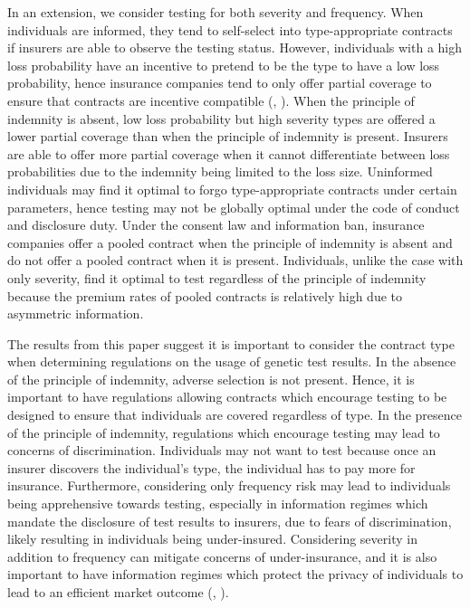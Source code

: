 \documentclass[nonatbib,preprint,12pt]{elsarticle}
\theoremstyle{plain}
\theoremstyle{definition}
\theoremstyle{plain}
\theoremstyle{TheoremNum}
\theoremstyle{CorollaryNum}
\theoremstyle{PropositionNum}
\theoremstyle{TheoremNum}
\begin{document}
In an extension, we consider testing for both severity and frequency. When individuals are informed, they tend to self-select into type-appropriate contracts if insurers are able to observe the testing status. However, individuals with a high loss probability have an incentive to pretend to be the type to have a low loss probability, hence insurance companies tend to only offer partial coverage to ensure that contracts are incentive compatible (\citeauthor{rothschild1978equilibrium}, \citeyear{rothschild1978equilibrium}). When the principle of indemnity is absent, low loss probability but high severity types are offered a lower partial coverage than when the principle of indemnity is present. Insurers are able to offer more partial coverage when it cannot differentiate between loss probabilities due to the indemnity being limited to the loss size. Uninformed individuals may find it optimal to forgo type-appropriate contracts under certain parameters, hence testing may not be globally optimal under the code of conduct and disclosure duty. Under the consent law and information ban, insurance companies offer a pooled contract when the principle of indemnity is absent and do not offer a pooled contract when it is present. Individuals, unlike the case with only severity, find it optimal to test regardless of the principle of indemnity because the premium rates of pooled contracts is relatively high due to asymmetric information. 

The results from this paper suggest it is important to consider the contract type when determining regulations on the usage of genetic test results. In the absence of the principle of indemnity, adverse selection is not present. Hence, it is important to have regulations allowing contracts which encourage testing to be designed to ensure that individuals are covered regardless of type. In the presence of the principle of indemnity, regulations which encourage testing may lead to concerns of discrimination. Individuals may not want to test because once an insurer discovers the individual's type, the individual has to pay more for insurance. Furthermore, considering only frequency risk may lead to individuals being apprehensive towards testing, especially in information regimes which mandate the disclosure of test results to insurers, due to fears of discrimination, likely resulting in individuals being under-insured. Considering severity in addition to frequency can mitigate concerns of under-insurance, and it is also important to have information regimes which protect the privacy of individuals to lead to an efficient market outcome (\citeauthor{rothschild2011efficiency}, \citeyear{rothschild2011efficiency}).
\end{document}
